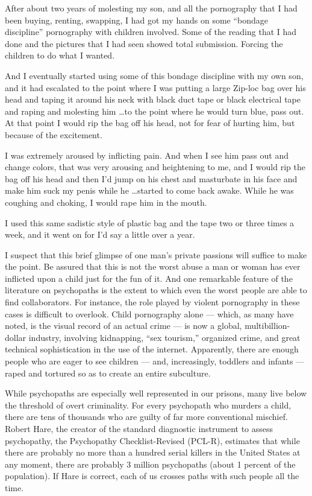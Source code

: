 \documentclass[a4paper,14pt]{extarticle}
\begin{document}
After about two years of molesting my son, and all the pornography that I had been buying, renting, swapping, I had got my hands on some ``bondage discipline'' pornography with children involved.
Some of the reading that I had done and the pictures that I had seen showed total submission.
Forcing the children to do what I wanted.

And I eventually started using some of this bondage discipline with my own son, and it had escalated to the point where I was putting a large Zip-loc bag over his head and taping it around his neck with black duct tape or black electrical tape and raping and molesting him \dots to the point where he would turn blue, pass out.
At that point I would rip the bag off his head, not for fear of hurting him, but because of the excitement.

I was extremely aroused by inflicting pain.
And when I see him pass out and change colors, that was very arousing and heightening to me, and I would rip the bag off his head and then I’d jump on his chest and masturbate in his face and make him suck my penis while he \dots started to come back awake.
While he was coughing and choking, I would rape him in the mouth.

I used this same sadistic style of plastic bag and the tape two or three times a week, and it went on for I’d say a little over a year.

I suspect that this brief glimpse of one man’s private passions will suffice to make the point.
Be assured that this is not the worst abuse a man or woman has ever inflicted upon a child just for the fun of it.
And one remarkable feature of the literature on psychopaths is the extent to which even the worst people are able to find collaborators.
For instance, the role played by violent pornography in these cases is difficult to overlook.
Child pornography alone --- which, as many have noted, is the visual record of an actual crime --- is now a global, multibillion-dollar industry, involving kidnapping, ``sex tourism,'' organized crime, and great technical sophistication in the use of the internet.
Apparently, there are enough people who are eager to see children --- and, increasingly, toddlers and infants --- raped and tortured so as to create an entire subculture.

While psychopaths are especially well represented in our prisons, many live below the threshold of overt criminality.
For every psychopath who murders a child, there are tens of thousands who are guilty of far more conventional mischief.
Robert Hare, the creator of the standard diagnostic instrument to assess psychopathy, the Psychopathy Checklist-Revised (PCL-R), estimates that while there are probably no more than a hundred serial killers in the United States at any moment, there are probably 3 million psychopaths (about 1 percent of the population).
If Hare is correct, each of us crosses paths with such people all the time.
\end{document}
